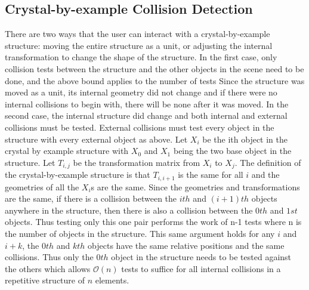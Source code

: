 \documentclass[twocolumn]{bmcart}%
\begin{document}
\subsection*{Crystal-by-example Collision Detection}
There are two ways that the user can interact with a crystal-by-example structure: moving the entire structure as a unit, or adjusting the internal transformation to change the shape of the structure.  In the first case, only collision tests between the structure and the other objects in the scene need to be done, and the above bound applies to the number of tests  Since the structure was moved as a unit, its internal geometry did not change and if there were no internal collisions to begin with, there will be none after it was moved.  In the second case, the internal structure did change and both internal and external collisions must be tested.  External collisions must test every object in the structure with every external object as above.  Let $X_i$ be the ith object in the crystal by example structure with $X_0$ and $X_1$ being the two base object in the structure.  Let $T_{i,j}$ be the transformation matrix from $X_i$ to $X_j$.  The definition of the crystal-by-example structure is that $T_{i,i+1}$ is the same for all $i$ and the geometries of all the $X_i$s are the same.  Since the geometries and transformations are the same, if there is a collision between the $ith$ and $(i+1)th$ objects anywhere in the structure, then there is also a collision between the $0th$ and $1st$ objects.  Thus testing only this one pair performs the work of n-1 tests where n is the number of objects in the structure.  This same argument holds for any $i$ and $i+k$, the $0th$ and $kth$ objects have the same relative positions and the same collisions.  Thus only the $0th$ object in the structure needs to be tested against the others which allows $\mathcal{O}(n)$ tests to suffice for all internal collisions in a repetitive structure of $n$ elements.

\end{document}
